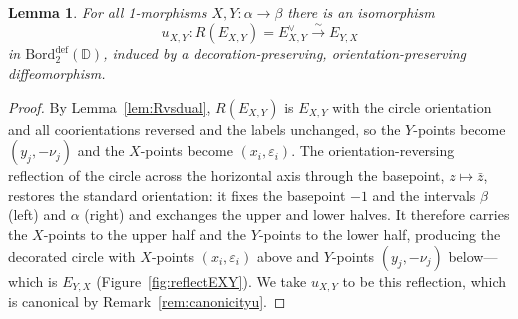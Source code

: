 \documentclass[11pt]{article}
\newtheorem{lemma}[theorem]{Lemma}
\theoremstyle{definition}
\newcommand{\bD}{\mathbb{D}}
\newcommand{\Bord}{\mathrm{Bord}}
\begin{document}
\begin{lemma}
\label{lem:EXYdual}
For all 1-morphisms $X, Y \colon \alpha \to \beta$ there is an isomorphism
\begin{equation}
  u_{X,Y} \colon R(E_{X,Y}) = E_{X,Y}^\vee \xrightarrow{\;\sim\;} E_{Y,X}
\end{equation}
in $\Bord_2^{\textrm{def}}(\bD)$, induced by a decoration-preserving, orientation-preserving diffeomorphism.
\end{lemma}

\begin{proof}
By Lemma~\ref{lem:Rvsdual}, $R(E_{X,Y})$ is $E_{X,Y}$ with the circle orientation and all coorientations reversed and the labels unchanged, so the $Y$-points become $(y_j, -\nu_j)$ and the $X$-points become $(x_i, \varepsilon_i)$. The orientation-reversing reflection of the circle across the horizontal axis through the basepoint, $z \mapsto \bar z$, restores the standard orientation: it fixes the basepoint $-1$ and the intervals $\beta$ (left) and $\alpha$ (right) and exchanges the upper and lower halves. It therefore carries the $X$-points to the upper half and the $Y$-points to the lower half, producing the decorated circle with $X$-points $(x_i,\varepsilon_i)$ above and $Y$-points $(y_j,-\nu_j)$ below---which is $E_{Y,X}$ (Figure~\ref{fig:reflectEXY}). We take $u_{X,Y}$ to be this reflection, which is canonical by Remark~\ref{rem:canonicityu}.
\end{proof}
\end{document}
